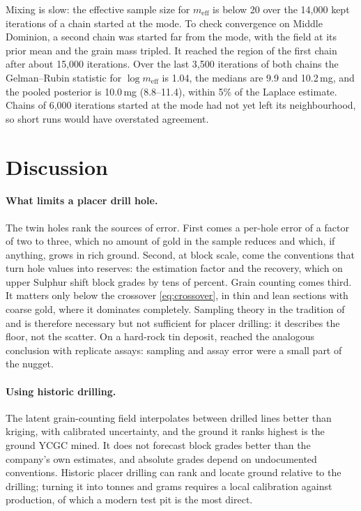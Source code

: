 \documentclass[11pt,a4paper]{article}
\theoremstyle{remark}
\newcommand{\meff}{m_{\mathrm{eff}}}
\begin{document}
Mixing is slow: the effective sample size for $\meff$ is below 20 over the 14,000 kept iterations of a chain started at the mode. To check convergence on Middle Dominion, a second chain was started far from the mode, with the field at its prior mean and the grain mass tripled. It reached the region of the first chain after about 15,000 iterations. Over the last 3,500 iterations of both chains the Gelman--Rubin statistic for $\log\meff$ is 1.04, the medians are 9.9 and 10.2\,mg, and the pooled posterior is 10.0\,mg (8.8--11.4), within 5\% of the Laplace estimate. Chains of 6,000 iterations started at the mode had not yet left its neighbourhood, so short runs would have overstated agreement.

\section{Discussion}\label{sec:discussion}

\paragraph{What limits a placer drill hole.} The twin holes rank the sources of error. First comes a per-hole error of a factor of two to three, which no amount of gold in the sample reduces and which, if anything, grows in rich ground. Second, at block scale, come the conventions that turn hole values into reserves: the estimation factor and the recovery, which on upper Sulphur shift block grades by tens of percent. Grain counting comes third. It matters only below the crossover \eqref{eq:crossover}, in thin and lean sections with coarse gold, where it dominates completely. Sampling theory in the tradition of \citet{Gy1979} and \citet{Clifton1969} is therefore necessary but not sufficient for placer drilling: it describes the floor, not the scatter. On a hard-rock tin deposit, \citet{Clark2010} reached the analogous conclusion with replicate assays: sampling and assay error were a small part of the nugget.

\paragraph{Using historic drilling.} The latent grain-counting field interpolates between drilled lines better than kriging, with calibrated uncertainty, and the ground it ranks highest is the ground YCGC mined. It does not forecast block grades better than the company's own estimates, and absolute grades depend on undocumented conventions. Historic placer drilling can rank and locate ground relative to the drilling; turning it into tonnes and grams requires a local calibration against production, of which a modern test pit is the most direct.
\end{document}
